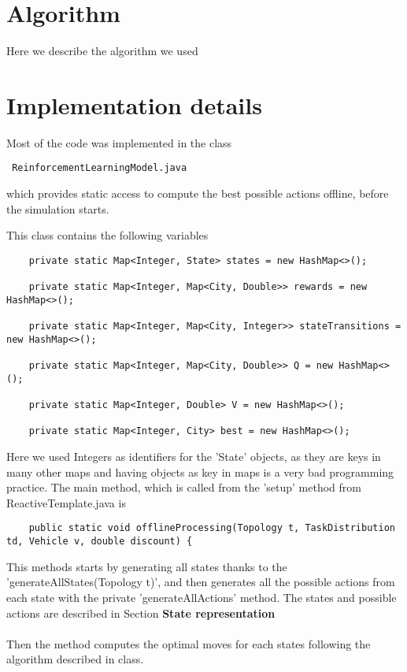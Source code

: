 \documentclass[fontsize=12pt]{scrartcl} %
\begin{document}
\section*{Algorithm}
Here we describe the algorithm we used
\section*{Implementation details}

Most of the code was implemented in the class 

\begin{verbatim} ReinforcementLearningModel.java \end{verbatim}


which provides static access to compute the best possible actions offline, before the simulation starts.

This class contains the following variables

\begin{verbatim}
	private static Map<Integer, State> states = new HashMap<>();
	
	private static Map<Integer, Map<City, Double>> rewards = new HashMap<>();
	
	private static Map<Integer, Map<City, Integer>> stateTransitions = new HashMap<>();
	
	private static Map<Integer, Map<City, Double>> Q = new HashMap<>();
	
	private static Map<Integer, Double> V = new HashMap<>();
	
	private static Map<Integer, City> best = new HashMap<>();
\end{verbatim}

Here we used Integers as identifiers for the 'State' objects, as they are keys in many other maps and having objects as key in maps is a very bad programming practice.
The main method, which is called from the 'setup' method from ReactiveTemplate.java is 

\begin{verbatim}
	public static void offlineProcessing(Topology t, TaskDistribution td, Vehicle v, double discount) {
\end{verbatim}

This methods starts by generating all states thanks to the 'generateAllStates(Topology t)', and then generates all the possible actions from each state with the private 'generateAllActions' method. The states and possible actions are described in Section \textbf{State representation} \\ \\
Then the method computes the optimal moves for each states following the algorithm described in class. \\
\end{document}
